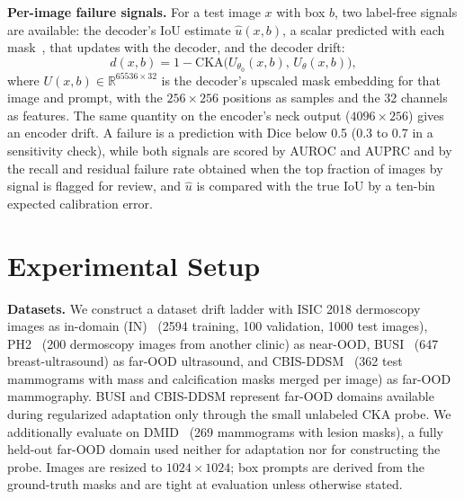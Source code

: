 \documentclass[runningheads]{llncs}
\begin{document}
\textbf{Per-image failure signals.} For a test image $x$ with box $b$, two label-free signals are available: the decoder's IoU estimate $\hat{u}(x, b)$, a scalar predicted with each mask~\cite{kirillov2023sam}, that updates with the decoder, and the decoder drift:
\begin{equation}
  d(x, b) = 1 - \mathrm{CKA}\bigl(U_{\theta_0}(x, b),\, U_{\theta}(x, b)\bigr),
  \label{eq:drift}
\end{equation}
where $U(x,b) \in \mathbb{R}^{65536 \times 32}$ is the decoder's upscaled mask embedding for that image and prompt, with the $256 \times 256$ positions as samples and the 32 channels as features. The same quantity on the encoder's neck output ($4096 \times 256$) gives an encoder drift. A failure is a prediction with Dice below 0.5 (0.3 to 0.7 in a sensitivity check), while both signals are scored by AUROC and AUPRC and by the recall and residual failure rate obtained when the top fraction of images by signal is flagged for review, and $\hat{u}$ is compared with the true IoU by a ten-bin expected calibration error.

\section{Experimental Setup}
\label{sec:setup}

\textbf{Datasets.} We construct a dataset drift ladder with ISIC 2018 dermoscopy images as in-domain (IN)~\cite{codella2019isic} (2594 training, 100 validation, 1000 test images), PH2~\cite{mendonca2013ph2} (200 dermoscopy images from another clinic) as near-OOD, BUSI~\cite{aldhabyani2020busi} (647 breast-ultrasound) as far-OOD ultrasound, and CBIS-DDSM~\cite{lee2017cbis} (362 test mammograms with mass and calcification masks merged per image) as far-OOD mammography. BUSI and CBIS-DDSM represent far-OOD domains available during regularized adaptation only through the small unlabeled CKA probe. We additionally evaluate on DMID~\cite{oza2024dmid} (269 mammograms with lesion masks), a fully held-out far-OOD domain used neither for adaptation nor for constructing the probe. Images are resized to $1024 \times 1024$; box prompts are derived from the ground-truth masks and are tight at evaluation unless otherwise stated.
\end{document}
